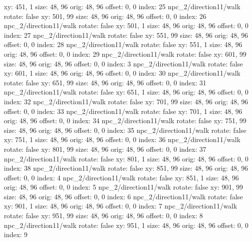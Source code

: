   xy: 451, 1
  size: 48, 96
  orig: 48, 96
  offset: 0, 0
  index: 25
npc_2/direction11/walk
  rotate: false
  xy: 501, 99
  size: 48, 96
  orig: 48, 96
  offset: 0, 0
  index: 26
npc_2/direction11/walk
  rotate: false
  xy: 501, 1
  size: 48, 96
  orig: 48, 96
  offset: 0, 0
  index: 27
npc_2/direction11/walk
  rotate: false
  xy: 551, 99
  size: 48, 96
  orig: 48, 96
  offset: 0, 0
  index: 28
npc_2/direction11/walk
  rotate: false
  xy: 551, 1
  size: 48, 96
  orig: 48, 96
  offset: 0, 0
  index: 29
npc_2/direction11/walk
  rotate: false
  xy: 601, 99
  size: 48, 96
  orig: 48, 96
  offset: 0, 0
  index: 3
npc_2/direction11/walk
  rotate: false
  xy: 601, 1
  size: 48, 96
  orig: 48, 96
  offset: 0, 0
  index: 30
npc_2/direction11/walk
  rotate: false
  xy: 651, 99
  size: 48, 96
  orig: 48, 96
  offset: 0, 0
  index: 31
npc_2/direction11/walk
  rotate: false
  xy: 651, 1
  size: 48, 96
  orig: 48, 96
  offset: 0, 0
  index: 32
npc_2/direction11/walk
  rotate: false
  xy: 701, 99
  size: 48, 96
  orig: 48, 96
  offset: 0, 0
  index: 33
npc_2/direction11/walk
  rotate: false
  xy: 701, 1
  size: 48, 96
  orig: 48, 96
  offset: 0, 0
  index: 34
npc_2/direction11/walk
  rotate: false
  xy: 751, 99
  size: 48, 96
  orig: 48, 96
  offset: 0, 0
  index: 35
npc_2/direction11/walk
  rotate: false
  xy: 751, 1
  size: 48, 96
  orig: 48, 96
  offset: 0, 0
  index: 36
npc_2/direction11/walk
  rotate: false
  xy: 801, 99
  size: 48, 96
  orig: 48, 96
  offset: 0, 0
  index: 37
npc_2/direction11/walk
  rotate: false
  xy: 801, 1
  size: 48, 96
  orig: 48, 96
  offset: 0, 0
  index: 38
npc_2/direction11/walk
  rotate: false
  xy: 851, 99
  size: 48, 96
  orig: 48, 96
  offset: 0, 0
  index: 4
npc_2/direction11/walk
  rotate: false
  xy: 851, 1
  size: 48, 96
  orig: 48, 96
  offset: 0, 0
  index: 5
npc_2/direction11/walk
  rotate: false
  xy: 901, 99
  size: 48, 96
  orig: 48, 96
  offset: 0, 0
  index: 6
npc_2/direction11/walk
  rotate: false
  xy: 901, 1
  size: 48, 96
  orig: 48, 96
  offset: 0, 0
  index: 7
npc_2/direction11/walk
  rotate: false
  xy: 951, 99
  size: 48, 96
  orig: 48, 96
  offset: 0, 0
  index: 8
npc_2/direction11/walk
  rotate: false
  xy: 951, 1
  size: 48, 96
  orig: 48, 96
  offset: 0, 0
  index: 9


